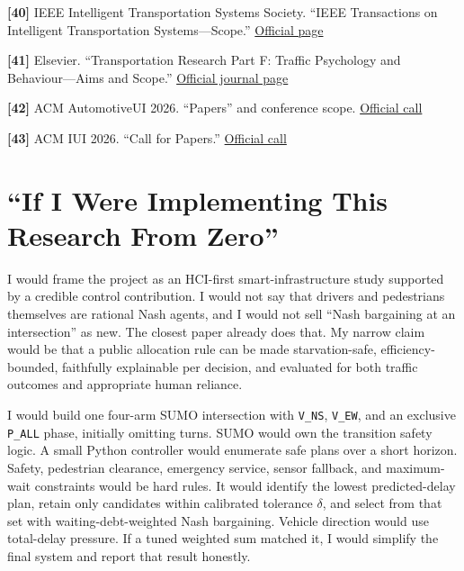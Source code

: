 \documentclass[
  english,
  11pt,
  a4paper,
]{article}
\begin{document}
\protect{}\label{source-40}{} \textbf{{[}40{]}} IEEE
Intelligent Transportation Systems Society. ``IEEE Transactions on
Intelligent Transportation Systems---Scope.''
\href{https://ieee-itss.org/pub/t-its/}{Official page}

\protect{}\label{source-41}{} \textbf{{[}41{]}} Elsevier.
``Transportation Research Part F: Traffic Psychology and
Behaviour---Aims and Scope.''
\href{https://shop.elsevier.com/journals/transportation-research-part-f-traffic-psychology-and-behaviour/1369-8478}{Official
journal page}

\protect{}\label{source-42}{} \textbf{{[}42{]}} ACM
AutomotiveUI 2026. ``Papers'' and conference scope.
\href{https://www.auto-ui.org/26/papers/}{Official call}

\protect{}\label{source-43}{} \textbf{{[}43{]}} ACM IUI
2026. ``Call for Papers.''
\href{https://iui.acm.org/2026/call-for-papers/}{Official call}

\section{``If I Were Implementing This Research From
Zero''}\label{if-i-were-implementing-this-research-from-zero}

I would frame the project as an HCI-first smart-infrastructure study
supported by a credible control contribution. I would not say that
drivers and pedestrians themselves are rational Nash agents, and I would
not sell ``Nash bargaining at an intersection'' as new. The closest
paper already does that. My narrow claim would be that a public
allocation rule can be made starvation-safe, efficiency-bounded,
faithfully explainable per decision, and evaluated for both traffic
outcomes and appropriate human reliance.

I would build one four-arm SUMO intersection with \texttt{V\_NS},
\texttt{V\_EW}, and an exclusive \texttt{P\_ALL} phase, initially
omitting turns. SUMO would own the transition safety logic. A small
Python controller would enumerate safe plans over a short horizon.
Safety, pedestrian clearance, emergency service, sensor fallback, and
maximum-wait constraints would be hard rules. It would identify the
lowest predicted-delay plan, retain only candidates within calibrated
tolerance \(\delta\), and select from that set with waiting-debt-weighted
Nash bargaining. Vehicle direction would use total-delay pressure. If a
tuned weighted sum matched it, I would simplify the final system and
report that result honestly.
\end{document}
